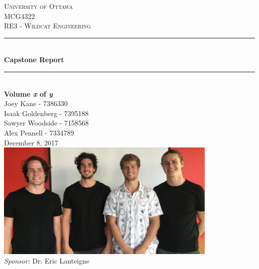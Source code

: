 \documentclass[]{book}
\newcommand{\reporttitle}{Capstone Report}
\begin{document}
\begin{titlepage}
\newcommand{\HRule}{\rule{\linewidth}{0.5mm}}
\center
 
\textsc{\LARGE University of Ottawa}\\[1.5cm]
\textsc{\Large MCG4322}\\[0.5cm]
\textsc{\large RE3 - Wildcat Engineering}\\[0.5cm]

\HRule \\[0.4cm]
{\huge \bfseries \reporttitle{}}\\
\HRule\\ [0.2cm]

\Large \textbf{Volume \textit{x} of \textit{y}} \\[1cm]

\Large Joey Kane - 7386330\\
Isaak Goldenberg - 7395188\\
Sawyer Woodside - 7158568\\
Alex Pennell - 7334789\\[0.5cm]

{\large December 8, 2017}\\[0.5cm] %

\includegraphics[width=0.8\textwidth]{img/general/boys.PNG}\\[0.5cm]

\large \emph{Sponsor:} Dr. Eric Lanteigne

\vfill
\end{titlepage}


\frontmatter

\end{document}
